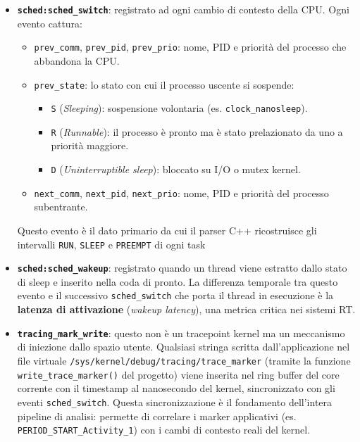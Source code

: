 \begin{itemize}
	\item \textbf{\texttt{sched:sched\_switch}}: registrato ad ogni cambio di contesto della CPU. Ogni evento cattura:
	\begin{itemize}
		\item \texttt{prev\_comm}, \texttt{prev\_pid}, \texttt{prev\_prio}: nome, PID e priorità del processo che abbandona la CPU.
		\item \texttt{prev\_state}: lo stato con cui il processo uscente si sospende:
		\begin{itemize}
			\item \texttt{S} (\textit{Sleeping}): sospensione volontaria (es. \texttt{clock\_nanosleep}).
			\item \texttt{R} (\textit{Runnable}): il processo è pronto ma è stato prelazionato da uno a priorità maggiore.
			\item \texttt{D} (\textit{Uninterruptible sleep}): bloccato su I/O o mutex kernel.
		\end{itemize}
		\item \texttt{next\_comm}, \texttt{next\_pid}, \texttt{next\_prio}: nome, PID e priorità del processo subentrante.
	\end{itemize}
	Questo evento è il dato primario da cui il parser C++ ricostruisce gli intervalli \texttt{RUN}, \texttt{SLEEP} e \texttt{PREEMPT} di ogni task 
	
	\item \textbf{\texttt{sched:sched\_wakeup}}: registrato quando un thread viene estratto dallo stato di sleep e inserito nella coda di pronto. La differenza temporale tra questo evento e il successivo \texttt{sched\_switch} che porta il thread in esecuzione è la \textbf{latenza di attivazione} (\textit{wakeup latency}), una metrica critica nei sistemi RT.
	
	\item \textbf{\texttt{tracing\_mark\_write}}: questo non è un tracepoint kernel ma un meccanismo di iniezione dallo spazio utente. Qualsiasi stringa scritta dall'applicazione nel file virtuale \texttt{/sys/kernel/debug/tracing/trace\_marker} (tramite la funzione \texttt{write\_trace\_marker()} del progetto) viene inserita nel ring buffer del core corrente con il timestamp al nanosecondo del kernel, sincronizzato con gli eventi \texttt{sched\_switch}. Questa sincronizzazione è il fondamento dell'intera pipeline di analisi: permette di correlare i marker applicativi (es. \texttt{PERIOD\_START\_Activity\_1}) con i cambi di contesto reali del kernel.
\end{itemize}

